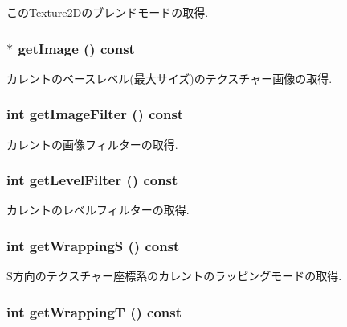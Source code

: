 このTexture2Dのブレンドモードの取得. \hypertarget{classm3g_1_1Texture2D_a8c0193b0e7d47d4b5c9f60df24c44f5}{
\subsubsection[{getImage}]{ $\ast$ getImage () const}}
\label{classm3g_1_1Texture2D_a8c0193b0e7d47d4b5c9f60df24c44f5}


カレントのベースレベル(最大サイズ)のテクスチャー画像の取得. \hypertarget{classm3g_1_1Texture2D_7b1e1ea0acc3d2096d346afdecc2ea5f}{
\subsubsection[{getImageFilter}]{\setlength{\rightskip}{0pt plus 5cm}int getImageFilter () const}}
\label{classm3g_1_1Texture2D_7b1e1ea0acc3d2096d346afdecc2ea5f}


カレントの画像フィルターの取得. \hypertarget{classm3g_1_1Texture2D_039f7813e846bedec1aaf4c413c15924}{
\subsubsection[{getLevelFilter}]{\setlength{\rightskip}{0pt plus 5cm}int getLevelFilter () const}}
\label{classm3g_1_1Texture2D_039f7813e846bedec1aaf4c413c15924}


カレントのレベルフィルターの取得. \hypertarget{classm3g_1_1Texture2D_6bdb583791178dc5002f4d0ae88293a9}{
\subsubsection[{getWrappingS}]{\setlength{\rightskip}{0pt plus 5cm}int getWrappingS () const}}
\label{classm3g_1_1Texture2D_6bdb583791178dc5002f4d0ae88293a9}


S方向のテクスチャー座標系のカレントのラッピングモードの取得. \hypertarget{classm3g_1_1Texture2D_58375e5e8ddde63dcf74f882d053ae3f}{
\subsubsection[{getWrappingT}]{\setlength{\rightskip}{0pt plus 5cm}int getWrappingT () const}}
\label{classm3g_1_1Texture2D_58375e5e8ddde63dcf74f882d053ae3f}


